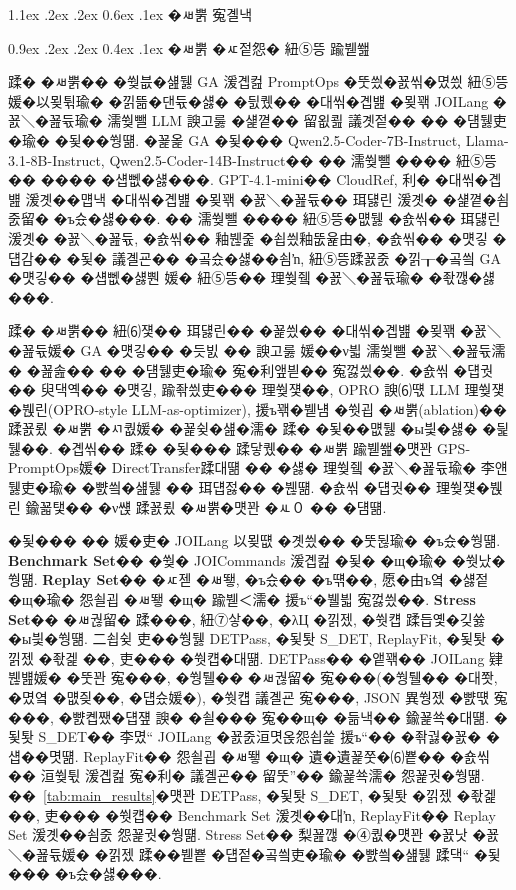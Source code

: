 \documentclass[10pt,twocolumn]{article}
\makeatletter
\renewcommand{\section}{\@startsection{section}{1}{\z@}%
{1.1ex \@plus .2ex \@minus .2ex}%
{0.6ex \@plus .1ex}%
{\normalfont\normalsize\bfseries}}
\renewcommand{\subsection}{\@startsection{subsection}{2}{\z@}%
{0.9ex \@plus .2ex \@minus .2ex}%
{0.4ex \@plus .1ex}%
{\normalfont\normalsize\bfseries}}
\makeatother
\begin{document}
\FloatBarrier

\section{�ㅽ뿕 寃곌낵}

\subsection{�ㅽ뿕 �ㅼ젙怨� 紐⑤뜽 踰붿쐞}

蹂� �ㅽ뿕�� �쒖븞�섎뒗 GA 湲곕컲 PromptOps �뚯씠�꾨씪�몄씠 紐⑤뜽 媛�以묒튂瑜� �낅뜲�댄듃�섏� �딄퀬�� �대씪�곕뱶 �묒꽦 JOILang �꾨＼�꾪듃瑜� 濡쒖뺄 LLM 諛고룷 �섍꼍�� 留욊쾶 議곗젙�� �� �덈뒗吏�瑜� �됯��쒕떎. �꾩옱 GA �됯��� Qwen2.5-Coder-7B-Instruct, Llama-3.1-8B-Instruct, Qwen2.5-Coder-14B-Instruct�� �� 濡쒖뺄 ���� 紐⑤뜽�� ���� �섑뻾�섏���. GPT-4.1-mini�� CloudRef, 利� �대씪�곕뱶 湲곗��먭낵 �대씪�곕뱶 �묒꽦 �꾨＼�꾪듃�� 珥덇린 湲곗� �섍꼍�쇰줈留� �ъ슜�섏���. �� 濡쒖뺄 ���� 紐⑤뜽�먮뒗 �숈씪�� 珥덇린 湲곗� �꾨＼�꾪듃, �숈씪�� 釉붾줉 �쇱씠釉뚮윭由�, �숈씪�� �먯깋 �덉감�� �됯� 議곌굔�� �곸슜�섏��쇰ŉ, 紐⑤뜽蹂꾨줈 �낅┰�곸씤 GA �먯깋�� �섑뻾�섏뿬 媛� 紐⑤뜽�� 理쒖쥌 �꾨＼�꾪듃瑜� �좏깮�섏���.

蹂� �ㅽ뿕�� 紐⑹쟻�� 珥덇린�� �꾩씠�� �대씪�곕뱶 �묒꽦 �꾨＼�꾪듃媛� GA �먯깋�� �듯빐 �� 諛고룷 媛��ν븳 濡쒖뺄 �꾨＼�꾪듃濡� �꾪솚�� �� �덈뒗吏�瑜� 寃�利앺븯�� 寃껋씠��. �숈씪 �덉궛�� 臾댁옉�� �먯깋, 踰좎씠吏��� 理쒖쟻��, OPRO 諛⑹떇 LLM 理쒖쟻�붽린(OPRO-style LLM-as-optimizer), 援ъ꽦�붿냼 �쒓굅 �ㅽ뿕(ablation)�� 蹂꾨룄 �ㅽ뿕 �ㅺ퀎媛� �꾩슂�섎�濡� 蹂� �됯��먮뒗 �ы븿�섏� �딅뒗��. �곕씪�� 蹂� �됯��� 蹂닿퀬�� �ㅽ뿕 踰붿쐞�먯꽌 GPS-PromptOps媛� DirectTransfer蹂대떎 �� �섏� 理쒖쥌 �꾨＼�꾪듃瑜� 李얜뒗吏�瑜� �뺤씤�섎뒗 �� 珥덉젏�� �붾떎. �숈씪 �덉궛�� 理쒖쟻�붽린 鍮꾧탳�� �ν썑 蹂꾨룄 �ㅽ뿕�먯꽌 �ㅻ０ �� �덈떎.

�됯��� �� 媛�吏� JOILang 以묒떖 �곗씠�� �뚯뒪瑜� �ъ슜�쒕떎. \textbf{Benchmark Set}�� �쒖� JOICommands 湲곕컲 �됯� �щ�瑜� �쒓났�쒕떎. \textbf{Replay Set}�� �ㅼ젣 �ㅽ뙣, �ъ슜�� �ъ떆��, 愿�由ъ옄 �섏젙 �щ�瑜� 怨쇨굅 �ㅽ뙣 �щ� 踰붿＜濡� 援ъ“�뷀븳 寃껋씠��. \textbf{Stress Set}�� �ㅽ궎留� 蹂���, 紐⑦샇��, �λЦ �낅젰, �쒓컙 蹂듭옟�깆쓣 �ы븿�쒕떎.
二쇱슂 吏��쒕뒗 DETPass, �됯퇏 S\_DET, ReplayFit, �됯퇏 �낅젰 �좏겙 ��, 吏��� �쒓컙�대떎. DETPass�� �앹꽦�� JOILang 肄붾뱶媛� �뚯꽌 寃���, �쒕퉬�� �ㅽ궎留� 寃���(�쒕퉬�� �대쫫, �몄옄 �먮즺��, �덉슜媛�), �쒓컙 議곌굔 寃���, JSON 異쒕젰 �뺤떇 寃���, �뺤콉쨌�덉쟾 諛� �쇨��� 寃��щ� �듦낵�� 鍮꾩쑉�대떎. �됯퇏 S\_DET�� 李몄“ JOILang �꾨줈洹몃옩怨쇱쓽 援ъ“�� �좎궗�꾨� �섑��몃떎. ReplayFit�� 怨쇨굅 �ㅽ뙣 �щ� 遺�遺꾩쭛�⑹뿉�� �숈씪�� 洹쒖튃 湲곕컲 寃�利� 議곌굔�� 留뚯”�� 鍮꾩쑉濡� 怨꾩궛�쒕떎. ��~\ref{tab:main_results}�먯꽌 DETPass, �됯퇏 S\_DET, �됯퇏 �낅젰 �좏겙 ��, 吏��� �쒓컙�� Benchmark Set 湲곗��대ŉ, ReplayFit�� Replay Set 湲곗��쇰줈 怨꾩궛�쒕떎. Stress Set�� 梨꾪깮 �④퀎�먯꽌 �꾨낫 �꾨＼�꾪듃媛� �낅젰 蹂��붿뿉 �덉젙�곸씤吏�瑜� �뺤씤�섎뒗 蹂댁“ �됯��� �ъ슜�섏���.
\end{document}
